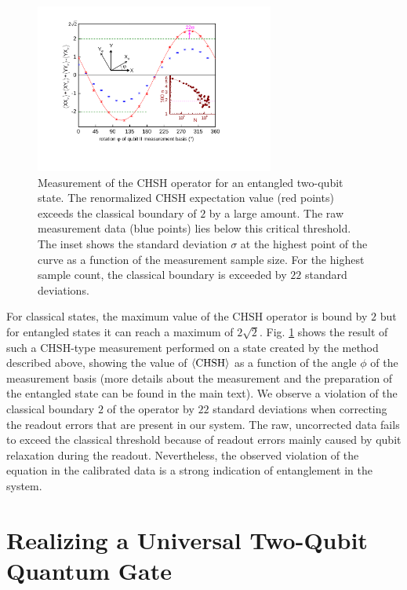 \begin{figure}[ht!]
	\centering
		\includegraphics[width=0.7\textwidth]{./material/papers/iswap/submission1/Dewes_Figure3}
	\caption[Measurement of the CHSH operator of an entanged two-qubit state]{Measurement of the CHSH operator for an entangled two-qubit state. The renormalized CHSH expectation value (red points) exceeds the classical boundary of $2$ by a large amount. The raw measurement data (blue points) lies below this critical threshold. The inset shows the standard deviation $\sigma$ at the highest point of the curve as a function of the measurement sample size. For the highest sample count, the classical boundary is exceeded by $22$ standard deviations.}
	\label{fig:chsh_measurement}
\end{figure}

For classical states, the maximum value of the $\mathrm{CHSH}$ operator is bound by $2$ but for entangled states it can reach a maximum of $2\sqrt{2}$. Fig. \ref{fig:chsh_measurement} shows the result of such a $\mathrm{CHSH}$-type measurement performed on a state created by the method described above, showing the value of $\left< \mathrm{CHSH} \right>$ as a function of the angle $\phi$ of the measurement basis (more details about the measurement and the preparation of the entangled state can be found in the main text). We observe a violation of the classical boundary $2$ of the operator by $22$ standard deviations when correcting the readout errors that are present in our system. The raw, uncorrected data fails to exceed the classical threshold because of readout errors mainly caused by qubit relaxation during the readout. Nevertheless, the observed violation of the equation in the calibrated data is a strong indication of entanglement in the system.

\section{Realizing a Universal Two-Qubit Quantum Gate}

